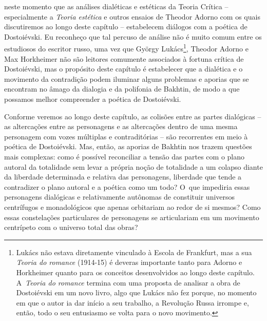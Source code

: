 {neste momento que as análises dialéticas e estéticas da Teoria Crítica
-- especialmente a \emph{Teoria estética} e outros ensaios de Theodor
Adorno com os quais discutiremos ao longo deste capítulo -- estabelecem
diálogos com a poética de Dostoiévski. Eu reconheço que tal percuso de
análise não é muito comum entre os estudiosos do escritor russo, uma vez
que György Lukács\footnote{Lukács não estava diretamente vinculado à
  Escola de Frankfurt, mas a sua \emph{Teoria do romance} (1914-15) é
  deveras importante tanto para Adorno e Horkheimer quanto para os
  conceitos desenvolvidos ao longo deste capítulo. A~\emph{Teoria do
  romance} termina com uma proposta de analisar a obra de Dostoiévski em
  um novo livro, algo que Lukács não fez porque, no momento em que o
  autor ia dar início a seu trabalho, a Revolução Russa irrompe e,
  então, todo o seu entusiasmo se volta para o novo movimento.}, Theodor
Adorno e Max Horkheimer não são leitores comumente associados à fortuna
crítica de Dostoiévski, mas o propósito deste capítulo é estabelecer que
a dialética e o movimento da contradição podem iluminar alguns problemas
e aporias que se encontram no âmago da dialogia e da polifonia de
Bakhtin, de modo a que possamos melhor compreender a poética de
Dostoiévski.

Conforme veremos ao longo deste capítulo, as colisões entre as partes
dialógicas -- as altercações entre as personagens e as altercações
dentro de uma mesma personagem com vozes múltiplas e contraditórias --
são recorrentes em meio à poética de Dostoiévski. Mas, então, as aporias
de Bakhtin nos trazem questões mais complexas: como é possível
reconciliar a tensão das partes com o plano autoral da totalidade sem
levar a própria noção de totalidade a um colapso diante da liberdade
determinada e relativa das personagens, liberdade que tende a
contradizer o plano autoral e a poética como um todo? O~que impediria
essas personagens dialógicas e relativamente autônomas de constituir
universos centrífugos e monadológicos que apenas orbitariam ao redor de
si mesmos? Como essas constelações particulares de personagens se
articulariam em um movimento centrípeto com o universo total das obras?

}
